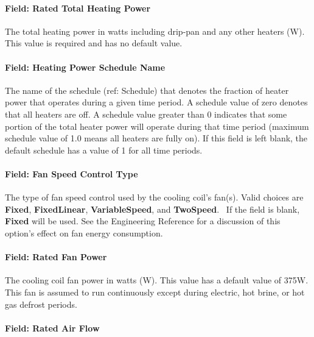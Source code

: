 \paragraph{Field: Rated Total Heating Power}\label{field-rated-total-heating-power-1}

The total heating power in watts including drip-pan and any other heaters (W). This value is required and has no default value.

\paragraph{Field: Heating Power Schedule Name}\label{field-heating-power-schedule-name-1}

The name of the schedule (ref: Schedule) that denotes the fraction of heater power that operates during a given time period. A schedule value of zero denotes that all heaters are off. A schedule value greater than 0 indicates that some portion of the total heater power will operate during that time period (maximum schedule value of 1.0 means all heaters are fully on). If this field is left blank, the default schedule has a value of 1 for all time periods.

\paragraph{Field: Fan Speed Control Type}\label{field-fan-speed-control-type-1}

The type of fan speed control used by the cooling coil's fan(s). Valid choices are \textbf{Fixed}, \textbf{FixedLinear}, \textbf{VariableSpeed}, and \textbf{TwoSpeed}.~ If the field is blank, \textbf{Fixed} will be used. See the Engineering Reference for a discussion of this option's effect on fan energy consumption.

\paragraph{Field: Rated Fan Power}\label{field-rated-fan-power-3}

The cooling coil fan power in watts (W). This value has a default value of 375W. This fan is assumed to run continuously except during electric, hot brine, or hot gas defrost periods.

\paragraph{Field: Rated Air Flow}\label{field-rated-air-flow}


